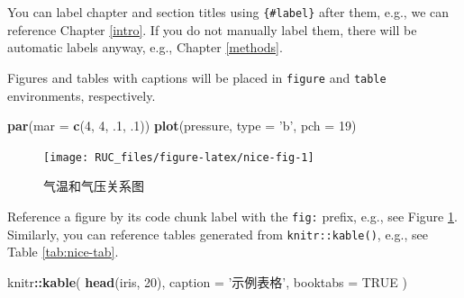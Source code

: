 \documentclass[a4paper,bachelor]{ructhesis}
\newenvironment{Shaded}{\begin{snugshade}}{\end{snugshade}}
\newcommand{\KeywordTok}[1]{\textcolor[rgb]{0.13,0.29,0.53}{\textbf{#1}}}
\newcommand{\DataTypeTok}[1]{\textcolor[rgb]{0.13,0.29,0.53}{#1}}
\newcommand{\DecValTok}[1]{\textcolor[rgb]{0.00,0.00,0.81}{#1}}
\newcommand{\StringTok}[1]{\textcolor[rgb]{0.31,0.60,0.02}{#1}}
\newcommand{\OtherTok}[1]{\textcolor[rgb]{0.56,0.35,0.01}{#1}}
\newcommand{\OperatorTok}[1]{\textcolor[rgb]{0.81,0.36,0.00}{\textbf{#1}}}
\newcommand{\NormalTok}[1]{#1}
\theoremstyle{definition}
\theoremstyle{definition}
\theoremstyle{definition}
\theoremstyle{remark}
\begin{document}
You can label chapter and section titles using \texttt{\{\#label\}}
after them, e.g., we can reference Chapter \ref{intro}. If you do not
manually label them, there will be automatic labels anyway, e.g.,
Chapter \ref{methods}.

Figures and tables with captions will be placed in \texttt{figure} and
\texttt{table} environments, respectively.

\begin{Shaded}
\begin{Highlighting}[]
\KeywordTok{par}\NormalTok{(}\DataTypeTok{mar =} \KeywordTok{c}\NormalTok{(}\DecValTok{4}\NormalTok{, }\DecValTok{4}\NormalTok{, .}\DecValTok{1}\NormalTok{, .}\DecValTok{1}\NormalTok{))}
\KeywordTok{plot}\NormalTok{(pressure, }\DataTypeTok{type =} \StringTok{'b'}\NormalTok{, }\DataTypeTok{pch =} \DecValTok{19}\NormalTok{)}
\end{Highlighting}
\end{Shaded}

\begin{figure}

{\centering \texttt{[image: RUC\_files/figure-latex/nice-fig-1]} 

}

\caption{气温和气压关系图}\label{fig:nice-fig}
\end{figure}

Reference a figure by its code chunk label with the \texttt{fig:}
prefix, e.g., see Figure \ref{fig:nice-fig}. Similarly, you can
reference tables generated from \texttt{knitr::kable()}, e.g., see Table
\ref{tab:nice-tab}.

\begin{Shaded}
\begin{Highlighting}[]
\NormalTok{knitr}\OperatorTok{::}\KeywordTok{kable}\NormalTok{(}
  \KeywordTok{head}\NormalTok{(iris, }\DecValTok{20}\NormalTok{), }\DataTypeTok{caption =} \StringTok{'示例表格'}\NormalTok{,}
  \DataTypeTok{booktabs =} \OtherTok{TRUE}
\NormalTok{)}
\end{Highlighting}
\end{Shaded}
\end{document}
